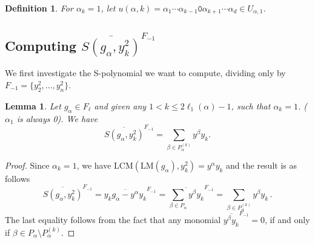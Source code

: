 \documentclass[10pt,a4paper]{article}
\newtheorem{lemma}{Lemma}[section]
\newtheorem{definition}{Definition}[section]
\begin{document}
%
%
%

\begin{definition} \label{u_alpha_one_k}
     For $\alpha_k=1$, let $u(\alpha, k) = \alpha_1 \cdots \alpha_{k-1}\texttt{0}\alpha_{k+1} \cdots \alpha_{d}\in U_{\alpha, 1}$.
\end{definition}

\subsection{Computing  $\overline{S(g_\alpha, y_k^2)}^{F_{-1}} $} \label{special_paths} We first investigate the S-polynomial we want to compute, dividing only by $F_{-1}=\{y_2^2,\ldots,y_n^2\}$.
\begin{lemma}
	    \label{spoly_lemma}
	    Let $g_\alpha \in F_\ell$ and
	     given any $1< k\le 2\ell_1(\alpha)-1$, such that $\alpha_k=1$.  ($\alpha_1$ is always 0). We have
	    \begin{equation} \label{spoly_lemma_eqn}
    	    	\overline{S(g_\alpha, y_k^2)}^{F_{-1}} = \sum_{\beta \in P_{\alpha}^{(k)}} y^\beta y_k.
	    \end{equation}
    \end{lemma} 
\begin{proof} 
	Since $\alpha_k =1$, we have $\text{LCM}(\text{LM}(g_\alpha), y_k^2) = y^\alpha y_k$ and the result is as follows
	$$
		\overline{S(g_\alpha, y_k^2)}^{F_{-1}}   =  \overline{y_k g_\alpha -y^\alpha y_k}^{F_{-1}}  
		=  \overline{\sum_{\beta \in P_{\alpha}} y^\beta y_k }^{F_{-1}} 
		=\sum_{\beta \in P_{\alpha}^{(k)}} y^\beta y_k\,.
	$$
	The last equality follows from the fact that any monomial $\overline{y^\beta y_k }^{F_{-1}}=0$, if and only if $\beta\in P_\alpha\setminus  P_{\alpha}^{(k)}$.
\end{proof}
\end{document}
